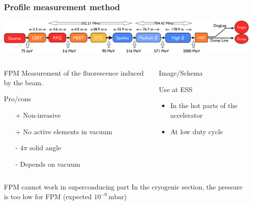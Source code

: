 \begin{frame}
  \frametitle{Profile measurement method}
  \includegraphics[width=\textwidth]{01_Neutron/fig/fig000_ESS_acc}
  \begin{columns}
    \begin{column}{0.45\textwidth}
      \begin{block}{FPM}
        Measurement of the fluorescence induced by the beam.
      \end{block}
      \begin{block}{Pro/cons}
        \begin{itemize}
          \item[+] Non-invasive
          \item[+] No active elements in vacuum
          \item[-] $4\pi$ solid angle
          \item[-] Depends on vacuum
        \end{itemize}
      \end{block}
    \end{column}
    \begin{column}{0.45\textwidth}
      Image/Schema
      \begin{block}{Use at ESS}
        \begin{itemize}
          \item In the hot parts of the accelerator
          \item At low duty cycle
        \end{itemize}
      \end{block}
    \end{column}
  \end{columns}
  \begin{alertblock}{FPM cannot work in superconducing part}
    In the cryogenic section, the pressure is too low for FPM (expected $10^{-9}\,\mathrm{mbar}$)
  \end{alertblock}
\end{frame}

